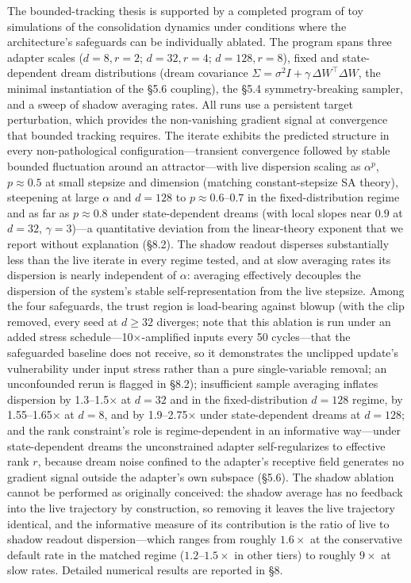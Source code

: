 \documentclass[11pt]{article}
\begin{document}
The bounded-tracking thesis is supported by a completed program of toy simulations of the consolidation dynamics under conditions where the architecture's safeguards can be individually ablated. The program spans three adapter scales ($d = 8, r = 2$; $d = 32, r = 4$; $d = 128, r = 8$), fixed and state-dependent dream distributions (dream covariance $\Sigma = \sigma^2 I + \gamma\, \Delta W^\top \Delta W$, the minimal instantiation of the \S 5.6 coupling), the \S 5.4 symmetry-breaking sampler, and a sweep of shadow averaging rates. All runs use a persistent target perturbation, which provides the non-vanishing gradient signal at convergence that bounded tracking requires. The iterate exhibits the predicted structure in every non-pathological configuration---transient convergence followed by stable bounded fluctuation around an attractor---with live dispersion scaling as $\alpha^p$, $p \approx 0.5$ at small stepsize and dimension (matching constant-stepsize SA theory), steepening at large $\alpha$ and $d = 128$ to $p \approx 0.6$--$0.7$ in the fixed-distribution regime and as far as $p \approx 0.8$ under state-dependent dreams (with local slopes near $0.9$ at $d = 32$, $\gamma = 3$)---a quantitative deviation from the linear-theory exponent that we report without explanation (\S 8.2). The shadow readout disperses substantially less than the live iterate in every regime tested, and at slow averaging rates its dispersion is nearly independent of $\alpha$: averaging effectively decouples the dispersion of the system's stable self-representation from the live stepsize. Among the four safeguards, the trust region is load-bearing against blowup (with the clip removed, every seed at $d \geq 32$ diverges; note that this ablation is run under an added stress schedule---10$\times$-amplified inputs every 50 cycles---that the safeguarded baseline does not receive, so it demonstrates the unclipped update's vulnerability under input stress rather than a pure single-variable removal; an unconfounded rerun is flagged in \S 8.2); insufficient sample averaging inflates dispersion by 1.3--1.5$\times$ at $d = 32$ and in the fixed-distribution $d = 128$ regime, by 1.55--1.65$\times$ at $d = 8$, and by 1.9--2.75$\times$ under state-dependent dreams at $d = 128$; and the rank constraint's role is regime-dependent in an informative way---under state-dependent dreams the unconstrained adapter self-regularizes to effective rank $r$, because dream noise confined to the adapter's receptive field generates no gradient signal outside the adapter's own subspace (\S 5.6). The shadow ablation cannot be performed as originally conceived: the shadow average has no feedback into the live trajectory by construction, so removing it leaves the live trajectory identical, and the informative measure of its contribution is the ratio of live to shadow readout dispersion---which ranges from roughly $1.6\times$ at the conservative default rate in the matched regime ($1.2$--$1.5\times$ in other tiers) to roughly $9\times$ at slow rates. Detailed numerical results are reported in \S 8.
\end{document}
